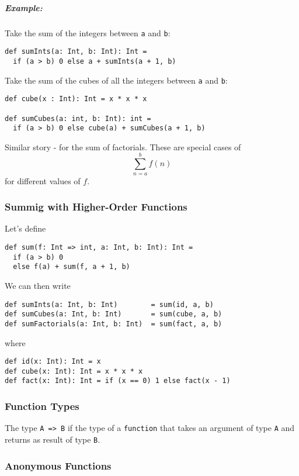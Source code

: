 \documentclass{scrartcl}
\newcommand{\example}{\subparagraph{Example:}} %
\newcommand{\term}[1]{\verb~#1~} %
\begin{document}
\example Take the sum of the integers between \lstinline|a| and \lstinline|b|:
\begin{lstlisting}
def sumInts(a: Int, b: Int): Int =
  if (a > b) 0 else a + sumInts(a + 1, b)
\end{lstlisting}

Take the sum of the cubes of all the integers between \lstinline|a| and
\lstinline|b|:

\begin{lstlisting}
def cube(x : Int): Int = x * x * x

def sumCubes(a: int, b: Int): int =
  if (a > b) 0 else cube(a) + sumCubes(a + 1, b)
\end{lstlisting}

Similar story - for the sum of factorials. These are special cases of
$$\sum_{n=a}^b f(n)$$
for different values of $f$.

\subsubsection{Summig with Higher-Order Functions}
\label{sec:SummingWHighOderFunctions}

Let's define
\begin{lstlisting}
def sum(f: Int => int, a: Int, b: Int): Int =
  if (a > b) 0
  else f(a) + sum(f, a + 1, b)
\end{lstlisting}

We can then write
\begin{lstlisting}
def sumInts(a: Int, b: Int)        = sum(id, a, b)
def sumCubes(a: Int, b: Int)       = sum(cube, a, b)
def sumFactorials(a: Int, b: Int)  = sum(fact, a, b)
\end{lstlisting}

where
\begin{lstlisting}
def id(x: Int): Int = x
def cube(x: Int): Int = x * x * x
def fact(x: Int): Int = if (x == 0) 1 else fact(x - 1)
\end{lstlisting}

\subsubsection{Function Types}
\label{sec:FuncTypes}

The type \lstinline|A => B| if the type of a \term{function} that takes an
argument of type \lstinline|A| and returns as result of type \lstinline|B|.

\subsubsection{Anonymous Functions}
\label{sec:AnonymousFuncitons}
\end{document}
